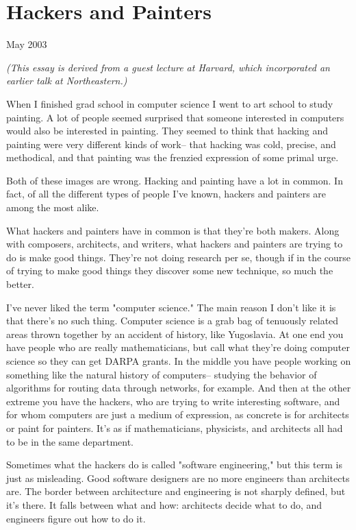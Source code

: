 \chapter{Hackers and Painters}





May 2003

\emph{(This essay is derived from a guest lecture at Harvard, which incorporated
an earlier talk at Northeastern.)}

When I finished grad school in computer science I went
to art school to study painting.  A lot of people seemed surprised
that someone interested in computers would also be interested in painting.
They seemed to think that
hacking and painting were very different kinds of work-- that
hacking was cold, precise, and methodical, and that
painting was the frenzied expression of some primal urge.

Both of these images are wrong.  Hacking and painting have a
lot in common.  In fact, of all the different types of people I've
known, hackers and painters are among the most alike.

What hackers and painters have in common is that they're
both makers.  Along with composers, architects, and writers,
what hackers and painters are trying to do is make good things.
They're not doing research per se, though if in the course of
trying to make good things they discover some new technique,
so much the better.



I've never liked the term "computer science."  The main
reason I don't like it is that there's no such thing.
Computer science is a
grab bag of tenuously related areas thrown together
by an accident of history, like Yugoslavia.
At one end you have people who are really mathematicians,
but call what they're doing computer science so they can get DARPA grants.
In the middle you have people working on
something like the natural history of computers-- studying the
behavior of algorithms for routing data through
networks, for example.  And then at the other extreme you
have the hackers, who are trying to
write interesting software, and for whom computers are just a
medium of expression, as concrete is for architects or
paint for painters.  It's as if
mathematicians, physicists, and architects all had to be in
the same department.

Sometimes what the hackers do is called "software engineering,"
but this term is just as misleading.
Good software designers are no more engineers than architects are.
The border between architecture and engineering is not sharply
defined, but it's there.
It falls between what and how: architects decide what to do,
and engineers figure out how to do it.

